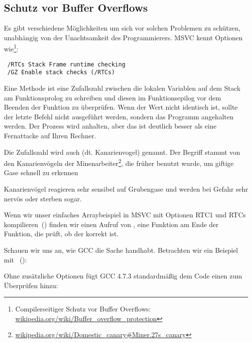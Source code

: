 \subsection{Schutz vor Buffer Overflows}
\label{subsec:BO_protection}
Es gibt verschiedene Möglichkeiten um sich vor solchen Problemen zu schützen, unabhängig von der Unachtsamkeit des \CCpp
Programmierers. MSVC kennt Optionen wie\footnote{Compilerseitiger Schutz vor Buffer Overflows:
\href{http://en.wikipedia.org/wiki/Buffer_overflow_protection}{wikipedia.org/wiki/Buffer\_overflow\_protection}}:

\begin{lstlisting}
 /RTCs Stack Frame runtime checking
 /GZ Enable stack checks (/RTCs)
\end{lstlisting}

Eine Methode ist eine Zufallszahl zwischen die lokalen Variablen auf dem Stack am Funktionsprolog zu schreiben und
diesen im Funktionsepilog vor dem Beenden der Funktion zu überprüfen.
Wenn der Wert nicht identisch ist, sollte der letzte \RET Befehl nicht ausgeführt werden, sondern das Programm
angehalten werden. Der Prozess wird anhalten, aber das ist deutlich besser als eine Fernattacke auf Ihren Rechner.
    
\newcommand{\CANARYURL}{\href{http://en.wikipedia.org/wiki/Domestic_Canary\#Miner.27s_canary}{wikipedia.org/wiki/Domestic\_canary\#Miner.27s\_canary}}

Die Zufallszahl wird auch  (dt. Kanarienvogel) genannt. Der Begriff stammt von den Kanarienvögeln der
Minenarbeiter\footnote{\CANARYURL}, die früher benutzt wurde, um giftige Gase schnell zu erkennen

Kanarienvögel reagieren sehr sensibel auf Grubengase und werden bei Gefahr sehr nervös oder sterben sogar.

Wenn wir unser einfaches Arraybeispiel in \ac{MSVC} mit Optionen RTC1 und RTCs kompilieren~()
finden wir einen Aufruf von , eine Funktion am Ende der Funktion, die prüft, ob der
 korrekt ist.

Schauen wir uns an, wie GCC die Sache handhabt.
Betrachten wir ein Beispiel mit ~():


Ohne zusätzliche Optionen fügt GCC 4.7.3 standardmäßig dem Code einen  zum Überprüfen hinzu:

